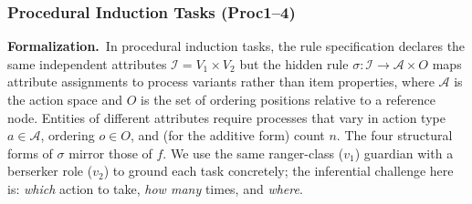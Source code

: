 \documentclass[11pt]{article}
\begin{document}


\subsubsection{Procedural Induction Tasks (Proc1--4)}
  \label{procedural induction}
  \noindent\textbf{Formalization.}~In procedural induction tasks, the rule specification declares the same independent attributes $\mathcal{I} = V_1 \times V_2$ but the hidden rule $\sigma: \mathcal{I} \to \mathcal{A} \times O$ maps attribute assignments to process variants rather than item properties, where $\mathcal{A}$ is the action space and $O$ is the set of ordering positions relative to a reference node. Entities of different attributes require processes that vary in action type $a \in \mathcal{A}$, ordering $o \in O$, and (for the additive form) count $n$. The four structural forms of $\sigma$ mirror those of $f$. We use the same ranger-class ($v_1$) guardian with a berserker role ($v_2$) to ground each task concretely; the inferential challenge here is: \emph{which} action to take, \emph{how many} times, and \emph{where}.
\end{document}
